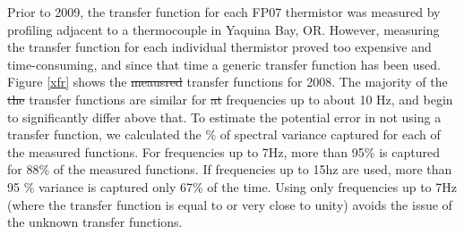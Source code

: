 \documentclass{ametsoc}
\providecommand{\DIFadd}[1]{{\protect\color{blue}\uwave{#1}}} %
\providecommand{\DIFdel}[1]{{\protect\color{red}\sout{#1}}}                      %
\providecommand{\DIFaddbegin}{} %
\providecommand{\DIFaddend}{} %
\providecommand{\DIFdelbegin}{} %
\providecommand{\DIFdelend}{} %
\begin{document}
\DIFdelbegin %
\DIFdelend \DIFaddbegin \appendix[C]
\DIFaddend 



Prior to 2009, the transfer function for each FP07 thermistor was measured by profiling adjacent to a thermocouple in Yaquina Bay, OR. However, measuring the transfer function for each individual thermistor proved too expensive and time-consuming, and since that time a generic transfer function has been used. Figure \ref{xfr} shows the \DIFdelbegin \DIFdel{meausred }\DIFdelend \DIFaddbegin \DIFadd{measured }\DIFaddend transfer functions for 2008. The majority of the \DIFdelbegin \DIFdel{the }\DIFdelend transfer functions are similar for \DIFdelbegin \DIFdel{at }\DIFdelend frequencies up to about 10 Hz, and begin to significantly differ above that. To estimate the potential error in not using a transfer function, we calculated the $\%$ of spectral variance captured for each of the measured functions. For frequencies up to 7Hz, more than 95\% is captured for 88\% of the measured functions. If frequencies up to 15hz are used, more than 95 \% variance is captured only 67\% of the time. Using only frequencies up to 7Hz (where the transfer function is equal to or very close to unity) avoids the issue of the unknown transfer functions.





\end{document}
